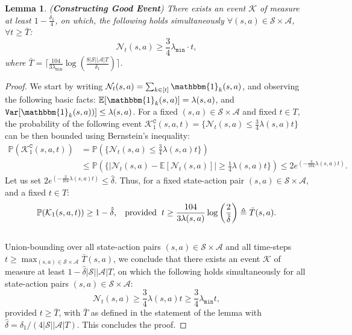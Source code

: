 \documentclass{article}
\newcommand{\mc}{\mathcal}
\newtheorem{lemma}{Lemma}
\begin{document}
\begin{lemma}\label{lemma:good_event} (\textbf{Constructing Good Event}) There exists an event $\mc{K}$ of measure at least \(1-\frac{\delta_1}{4}\), on which, the following holds simultaneously \(\forall (s,a) \in \mc{S} \times \mc{A}\), \(\forall t \ge \bar{T}\):
   $$ \mc{N}_t(s,a) \ge \frac{3}{4}\lambda_{\texttt{min}} \cdot t, $$
    where \(\bar{T} = \Big\lceil \frac{104}{3\lambda_{\texttt{min}}} \log \left(\frac{8 |\mc{S}||\mc{A}|T}{\delta_1}\right)\Big\rceil\).
\end{lemma}
\begin{proof}
    We start by writing $\mathcal{N}_t(s,a) = \sum_{k \in [t]} \mathbbm{1}_k(s,a)$, and observing the following basic facts: \(\mathbb{E} [\mathbbm{1}_k(s,a)] = \lambda(s,a)\), and  \(\texttt{Var}[\mathbbm{1}_k(s,a))] \le \lambda(s,a)\). For a fixed \((s,a) \in \mc{S} \times \mc{A}\) and fixed \(t \in T\), the probability of the following event \(\mathcal{K}_1^\texttt{C}(s,a,t) = \{\mathcal{N}_t(s,a) \le \frac{3}{4}\lambda(s,a)t\}\) can be then bounded using 
 Bernstein's inequality:
    \begin{equation}
\begin{aligned}\label{eqn:decom_1_good_event}
    \mathbb{P}(\mathcal{K}_1^\texttt{C}(s,a,t)) &= \mathbb{P}\left( \Big\{\mathcal{N}_t(s,a) \le \frac{3}{4}\lambda(s,a)t\Big\}\right)\\
    &\le \mathbb{P}\left( \Big\{\Big\lvert \mathcal{N}_t(s,a) - \mathbb{E}\left[\mathcal{N}_t(s,a)\right] \Big\rvert \ge \frac{1}{4}\lambda(s,a)t\Big\}\right) \le 2e^{\left(-\frac{3}{104}\lambda(s,a) t \right)}. 
\end{aligned}
\end{equation}
Let us set \( 2e^{\left(-\frac{3}{104}\lambda(s,a) t\right)} \le \hat{\delta} \). Thus, for a fixed state-action pair \((s,a) \in \mc{S} \times \mc{A}\), and a fixed \(t \in T\):
\[\mathbb{P}(\mc{K}_1(s,a,t)) \ge 1 - \hat{\delta}, \hspace{3 mm} \textrm{provided} \hspace{2 mm} t \ge \frac{104}{3\lambda(s,a)}\log\left(\frac{2}{\hat{\delta}}\right) \triangleq \bar{T}(s,a).\]\\
Union-bounding over all state-action pairs $(s, a) \in \mathcal{S} \times \mathcal{A}$ and all time-steps $t \geq \max_{(s,a) \in \mc{S} \times \mc{A}} \bar{T}(s,a)$, we conclude that there exists an event $\mc{K}$ of measure at least $ 1 - \hat{\delta}|\mc{S}||\mc{A}|T$, on which the following holds simultaneously for all state-action pairs $(s,a) \in  \mc{S} \times \mc{A}$:
$$\mathcal{N}_t(s,a) \geq \frac{3}{4}\lambda(s,a)t \geq \frac{3}{4}\lambda_{\texttt{min}} t, $$
provided $t \geq \bar{T}$, with $\bar{T}$ as defined in the statement of the lemma with \(\hat{\delta} = \delta_1/(4|\mc{S}||\mc{A}|T) \). This concludes the proof. 
\end{proof}
\end{document}
